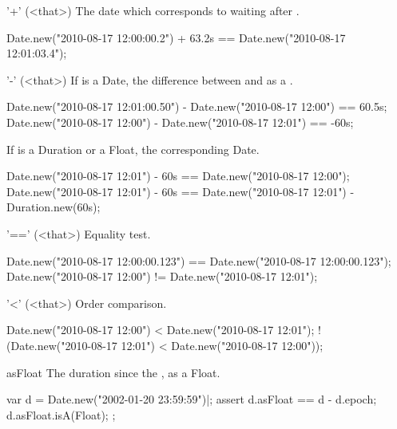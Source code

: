 \begin{urbiscriptapi}
\item['+'](<that>)%
  The date which corresponds to waiting  
  after \this.
\begin{urbiassert}
Date.new("2010-08-17 12:00:00.2") + 63.2s == Date.new("2010-08-17 12:01:03.4");
\end{urbiassert}

\item['-'](<that>)%
  If  is a Date, the difference between \this and  as a
  .
\begin{urbiassert}
Date.new("2010-08-17 12:01:00.50") - Date.new("2010-08-17 12:00") == 60.5s;
Date.new("2010-08-17 12:00")       - Date.new("2010-08-17 12:01") == -60s;
\end{urbiassert}

If  is a Duration or a Float, the corresponding Date.

\begin{urbiassert}
Date.new("2010-08-17 12:01") - 60s == Date.new("2010-08-17 12:00");
Date.new("2010-08-17 12:01") - 60s
  == Date.new("2010-08-17 12:01") - Duration.new(60s);
\end{urbiassert}

\item['=='](<that>)%
  Equality test.
\begin{urbiassert}
Date.new("2010-08-17 12:00:00.123") == Date.new("2010-08-17 12:00:00.123");
Date.new("2010-08-17 12:00")        != Date.new("2010-08-17 12:01");
\end{urbiassert}

\item['<'](<that>)%
  Order comparison.
\begin{urbiassert}
   Date.new("2010-08-17 12:00") < Date.new("2010-08-17 12:01");
! (Date.new("2010-08-17 12:01") < Date.new("2010-08-17 12:00"));
\end{urbiassert}

\item[asFloat] The duration since the , as a Float.
\begin{urbiscript}
var d = Date.new("2002-01-20 23:59:59")|;
assert
{
  d.asFloat == d - d.epoch;
  d.asFloat.isA(Float);
};
\end{urbiscript}


\end{urbiscriptapi}
